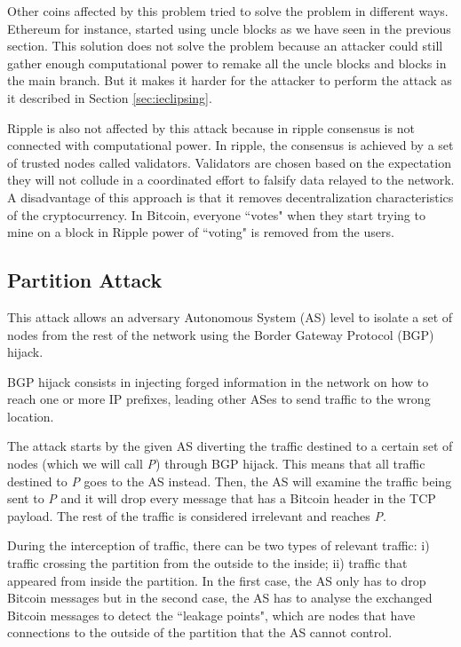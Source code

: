 Other coins affected by this problem tried to solve the problem in different ways. Ethereum for instance, started using uncle blocks as we have seen in the previous section. This solution does not solve the problem because an attacker could still gather enough computational power to remake all the uncle blocks and blocks in the main branch. But it makes it harder for the attacker to perform the attack as it described in Section \ref{sec:ieclipsing}.

Ripple is also not affected by this attack because in ripple consensus is not connected with computational power. In ripple, the consensus is achieved by a set of trusted nodes called validators. Validators are chosen based on the expectation they will not collude in a coordinated effort to falsify data relayed to the network. A disadvantage of this approach is that it removes decentralization characteristics of the cryptocurrency. In Bitcoin, everyone ``votes" when they start trying to mine on a block in Ripple power of ``voting" is removed from the users.


\subsection{Partition Attack}
This attack allows an adversary Autonomous System (AS) level to isolate a set of nodes from the rest of the network using the Border Gateway Protocol (BGP) hijack. 

BGP hijack consists in injecting forged information in the network on how to reach one or more IP prefixes, leading other ASes to send traffic to the wrong location. 

The attack starts by the given AS diverting the traffic destined to a certain set of nodes (which we will call \textit{P}) through BGP hijack. This means that all traffic destined to \textit{P} goes to the AS instead. Then, the AS will examine the traffic being sent to \textit{P} and it will drop every message that has a Bitcoin header in the TCP payload. The rest of the traffic is considered irrelevant and reaches \textit{P}.

During the interception of traffic, there can be two types of relevant traffic: i) traffic crossing the partition from the outside to the inside; ii) traffic that appeared from inside the partition. In the first case, the AS only has to drop Bitcoin messages but in the second case, the AS has to analyse the exchanged Bitcoin messages to detect the ``leakage points", which are nodes that have connections to the outside of the partition that the AS cannot control. 

